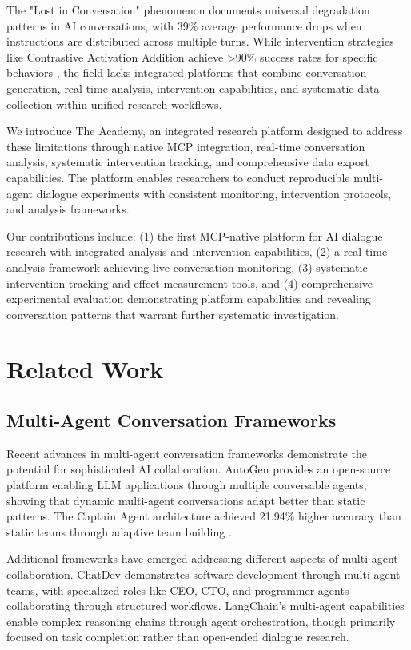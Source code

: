 \documentclass[11pt,letterpaper]{article}
\newcommand{\theacademy}{The Academy}
\newcommand{\mcp}{MCP}
\begin{document}
The "Lost in Conversation" phenomenon \citep{laban2025lost} documents universal degradation patterns in AI conversations, with 39\% average performance drops when instructions are distributed across multiple turns. While intervention strategies like Contrastive Activation Addition achieve >90\% success rates for specific behaviors \citep{panickssery2024activation}, the field lacks integrated platforms that combine conversation generation, real-time analysis, intervention capabilities, and systematic data collection within unified research workflows.

We introduce \theacademy{}, an integrated research platform designed to address these limitations through native \mcp{} integration, real-time conversation analysis, systematic intervention tracking, and comprehensive data export capabilities. The platform enables researchers to conduct reproducible multi-agent dialogue experiments with consistent monitoring, intervention protocols, and analysis frameworks.

Our contributions include: (1) the first \mcp{}-native platform for AI dialogue research with integrated analysis and intervention capabilities, (2) a real-time analysis framework achieving live conversation monitoring, (3) systematic intervention tracking and effect measurement tools, and (4) comprehensive experimental evaluation demonstrating platform capabilities and revealing conversation patterns that warrant further systematic investigation.

\section{Related Work}

\subsection{Multi-Agent Conversation Frameworks}

Recent advances in multi-agent conversation frameworks demonstrate the potential for sophisticated AI collaboration. AutoGen \citep{wu2023autogen} provides an open-source platform enabling LLM applications through multiple conversable agents, showing that dynamic multi-agent conversations adapt better than static patterns. The Captain Agent architecture achieved 21.94\% higher accuracy than static teams through adaptive team building \citep{song2025adaptive}.

Additional frameworks have emerged addressing different aspects of multi-agent collaboration. ChatDev \citep{qian2023chatdev} demonstrates software development through multi-agent teams, with specialized roles like CEO, CTO, and programmer agents collaborating through structured workflows. LangChain's multi-agent capabilities enable complex reasoning chains through agent orchestration, though primarily focused on task completion rather than open-ended dialogue research.
\end{document}
